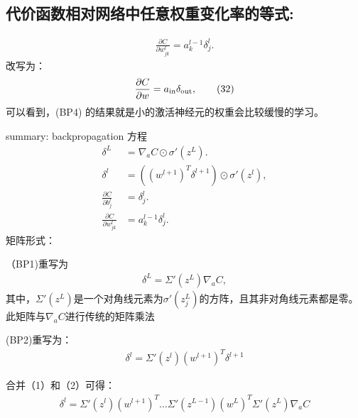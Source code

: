 \subsection{代价函数相对网络中任意权重变化率的等式:}
\begin{align}
\frac{\partial C}{\partial w^l_{jk}} = a^{l-­1}_k \delta^l_j. \tag{BP4}
\end{align}
改写为：
\begin{align}
\frac{\partial C}{\partial w} = a_{\rm in} \delta_{\rm out}, \tag{32}
\end{align}
可以看到，(BP4) 的结果就是小的激活神经元的权重会比较缓慢的学习。

\begin{framed}
summary: backpropagation 方程
\begin{align*}
\delta^L & = \nabla_a C \odot \sigma'(z^L). \tag{BP1} \\
\delta^l & = ((w^{l+1})^T \delta^{l+1}) \odot \sigma'(z^l), \tag{BP2} \\
\frac{\partial C}{\partial b^l_j} & = \delta^l_j. \tag{BP3} \\
\frac{\partial C}{\partial w^l_{jk}} & = a^{l-­1}_k \delta^l_j. \tag{BP4}
\end{align*}
矩阵形式：

（BP1)重写为
\begin{align}
\delta^L = \Sigma'(z^L) \nabla_a C,\tag{1}
\end{align}
其中，$\Sigma'(z^L)$是一个对角线元素为$\sigma'(z^L_j)$的方阵，且其非对角线元素都是零。
此矩阵与$\nabla_a C$进行传统的矩阵乘法

(BP2)重写为：
\begin{align}
\delta^l = \Sigma'(z^l) (w^{l+1})^T\delta^{l+1} \tag{2}
\end{align}

合并（1）和（2）可得：
\begin{align}
\delta^l = \Sigma'(z^l)(w^{l+1})^T \ldots 
\Sigma'(z^{L-­1}) (w^L)^T \Sigma'(z^L) \nabla_a C \tag{3}
\end{align}
\end{framed}

